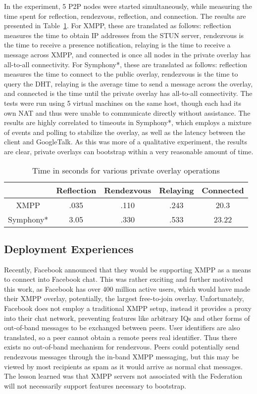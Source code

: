 \documentclass[conference]{IEEEtran}
\begin{document}
In the experiment, 5 P2P nodes were started simultaneously, while measuring the
time spent for reflection, rendezvous, reflection, and connection.  The results
are presented in Table~\ref{tab:results}.  For XMPP, these are translated as
follows:  reflection measures the time to obtain IP addresses from the STUN
server, rendezvous is the time to receive a presence notification, relaying is
the time to receive a message across XMPP, and connected is once all nodes in
the private overlay has all-to-all connectivity.  For Symphony*, these are
translated as follows:  reflection measures the time to connect to the public
overlay, rendezvous is the time to query the DHT, relaying is the average time
to send a message across the overlay, and connected is the time until the
private overlay has all-to-all connectivity.  The tests were run using 5
virtual machines on the same host, though each had its own NAT and thus were
unable to communicate directly without assistance.  The results are highly
correlated to timeouts in Symphony*, which employs a mixture of events and polling
to stabilize the overlay, as well as the latency between the client and
GoogleTalk.  As this was more of a qualitative experiment, the results are
clear, private overlays can bootstrap within a very reasonable amount of time.

\begin{table}[ht]
\centering
\begin{tabular}{|c||c|c|c|c|}
\hline & Reflection & Rendezvous & Relaying & Connected \\ \hline \hline
XMPP & .035 & .110 & .243 & 20.3 \\ \hline
Symphony* & 3.05 & .330 & .533 & 23.22 \\ \hline
\end{tabular}
\caption{Time in seconds for various private overlay operations}
\label{tab:results}
\end{table}

\subsection{Deployment Experiences}

Recently, Facebook announced that they would be supporting XMPP as a means to
connect into Facebook chat.  This was rather exciting and further motivated
this work, as Facebook has over 400 million active users, which would have made
their XMPP overlay, potentially, the largest free-to-join overlay.
Unfortunately, Facebook does not employ a traditional XMPP setup, instead it
provides a proxy into their chat network, preventing features like arbitrary
IQs and other forms of out-of-band messages to be exchanged between peers.
User identifiers are also translated, so a peer cannot obtain a remote peers
real identifier.  Thus there exists no out-of-band mechanism for rendezvous.
Peers could potentially send rendezvous messages through the in-band XMPP
messaging, but this may be viewed by most recipients as spam as it would
arrive as normal chat messages.  The lesson learned was that XMPP servers
not associated with the Federation will not necessarily support features
necessary to bootstrap.
\end{document}
